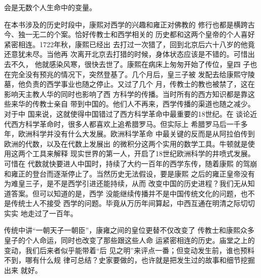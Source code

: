 会是无数个人生命中的变量。%
\par
在本书涉及的历史时段中，康熙对西学的兴趣和雍正对佛教的%
修行也都是横跨古今、独一无二的个案。恰好传教士和西学相关的%
历史都和这两个皇帝的个人喜好紧密相连。1722年秋，康熙已经出%
去打过一次猎了，回到北京后六十八岁的他竟还意犹未尽。当他再%
次离开北京去打猎的时候，身体状态应该是不错的。可惜出去不久，%
他就感染风寒，很快去世了。康熙在病床上匆匆开始了传位，皇四%
子也在完全没有预兆的情况下，突然登基了。几个月后，皇三子被%
发配去给康熙守陵墓，他负责的西学事业也随之停止。又过了几个%
月，传教士的教也被禁了，这在影响天主教人华的同时也影响了西%
方科学的传播。当时所有的西方知识都是靠这些来华的传教士亲自%
带到中国的。他们人不再来，西学传播的渠道也随之减少。对于中%
国来说，这就使得中国错过了西方科学革命中最重要的18世纪。在%
谈论近代西方科学革命时，很多人都喜欢上追希腊罗马。但实际上%
希腊罗马后一千多年，欧洲科学并没有什么大发展。欧洲科学革命%
中最关键的反而是从阿拉伯传到欧洲的代数，以及在代数上发展出%
的微积分这两个实用的数学工具。牛顿就是使用这两个工具来解释%
现实世界的第一人，开启了18世纪欧洲科学的井喷式发展。可惜在%
代数就快要进人中国时，持续了大约一百年的西学东传，随着康熙%
的驾崩和雍正的登台而逐渐停止了。当然历史无法假设，要是康熙%
之后的雍正皇帝没有为难皇三子，是不是西学引进还能持续，从而%
改变中国的历史进程？我们无从知道答案。但可以知道的是，西学%
没能继续传播并不是中国传统文化的问题，也不是传统士人不接受%
西学的问题。毕竟从万历年间算起，中西互通在明清之际切切实实%
地走过了一百年。%
\par
传统中讲“一朝天子一朝臣”，康雍之间的皇位更替不仅改变了%
传教士和康熙众多皇子的个人命运，同时也改变了那些跟这些人命%
运紧密相连的历史。庙堂之上的变动，我们后来者似乎能带着“后%
见之明”来评点一番；但变动发生前，谁也预料不到，哪有什么规%
律可总结？史家要做的，也许就是把发生过的故事和细节挖掘出来%
就好。%
